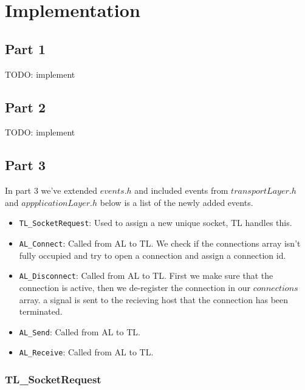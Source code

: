 \section{Implementation}
\subsection{Part 1}
TODO: implement
\subsection{Part 2}
TODO: implement
\subsection{Part 3}

In part 3 we've extended $events.h$ and included events from $transportLayer.h$ and $appplicationLayer.h$
below is a list of the newly added events.
\begin{itemize}
\item \texttt{TL\_SocketRequest}: Used to assign a new unique socket, TL handles this.

\item \texttt{AL\_Connect}: Called from AL to TL.
We check if the connections array isn't fully occupied and try to open a connection and assign a connection id.

\item \texttt{AL\_Disconnect}: Called from AL to TL. First we make sure that the connection is active, then we de-register the connection in our $connections$ array.
a signal is sent to the recieving host that the connection has been terminated.

\item \texttt{AL\_Send}: Called from AL to TL.

\item \texttt{AL\_Receive}: Called from AL to TL.

\end{itemize}

\subsubsection{TL\_SocketRequest}
\begin{lstlisting}
\end{lstlisting}

